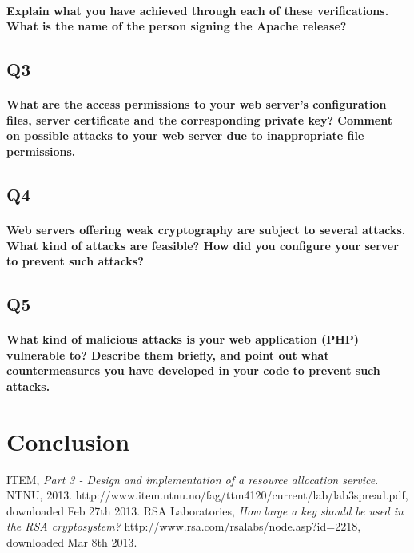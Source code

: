 \documentclass[a4paper,11pt]{article}
\begin{document}
\paragraph{Explain what you have achieved through each of these veriﬁcations. What is the name of
the person signing the Apache release?}
\subsection{Q3}
\paragraph{What are the access permissions to your web server’s conﬁguration ﬁles, server certiﬁcate
and the corresponding private key? Comment on possible attacks to your web server due to
inappropriate ﬁle permissions.}
\subsection{Q4}
\paragraph{Web servers oﬀering weak cryptography are subject to several attacks. What kind of
attacks are feasible? How did you conﬁgure your server to prevent such attacks?}
\subsection{Q5}
\paragraph{What kind of malicious attacks is your web application (PHP) vulnerable to? Describe
them brieﬂy, and point out what countermeasures you have developed in your code to prevent
such attacks.}
\section*{Conclusion}
\begin{thebibliography}{9}
ITEM, 
	\emph{Part 3 - Design and implementation of a resource allocation service}.
	NTNU, 2013.  http://www.item.ntnu.no/fag/ttm4120/current/lab/lab3spread.pdf, downloaded Feb 27th 2013.
RSA Laboratories, \emph{How large a key should be used in the RSA cryptosystem?} http://www.rsa.com/rsalabs/node.asp?id=2218, downloaded Mar 8th 2013.	
\end{thebibliography}
\listoffigures
\end{document}
